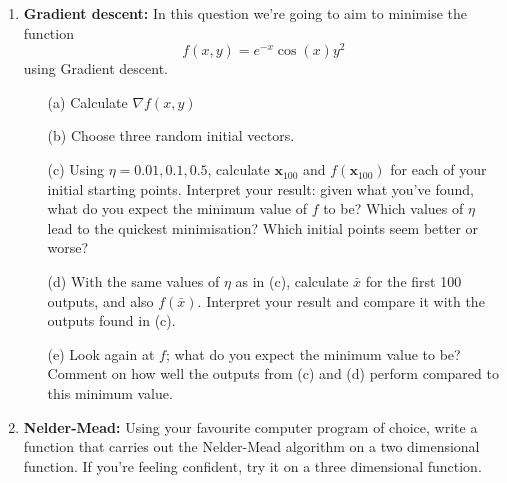 \documentclass[11pt,a4paper]{scrartcl}
\begin{document}
\begin{enumerate}
\item \textbf{Gradient descent: } In this question we're going to aim to minimise the function 
\[
f(x,y) = e^{-x}\cos(x) y^2
\]
using Gradient descent.

\begin{enumerate}
    \item[(a)] Calculate $\nabla f(x,y)$
    \item[(b)] Choose three random initial vectors.
    \item[(c)] Using $\eta = 0.01, 0.1, 0.5$, calculate $\mathbf{x}_{100}$ and $f(\mathbf{x}_{100})$ for each of your initial starting points. Interpret your result: given what you've found, what do you expect the minimum value of $f$ to be? Which values of $\eta$ lead to the quickest minimisation? Which initial points seem better or worse?
    \item[(d)] With the same values of $\eta$ as in (c), calculate $\bar{x}$ for the first 100 outputs, and also $f(\bar{x})$. Interpret your result and compare it with the outputs found in (c).
    \item[(e)] Look again at $f$; what do you expect the minimum value to be? Comment on how well the outputs from (c) and (d) perform compared to this minimum value.
\end{enumerate}

\item \textbf{Nelder-Mead: } Using your favourite computer program of choice, write a function that carries out the Nelder-Mead algorithm on a two dimensional function. If you're feeling confident, try it on a three dimensional function. 


\end{enumerate}
\end{document}
